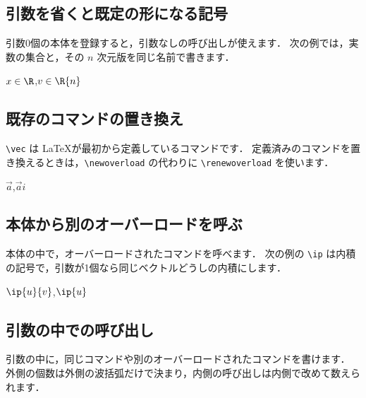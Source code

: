 \documentclass[lualatex,ja = standard,a4paper,11pt]{bxjsarticle}
\begin{document}
\subsection{引数を省くと既定の形になる記号}

引数0個の本体を登録すると，引数なしの呼び出しが使えます．
次の例では，実数の集合と，その $n$ 次元版を同じ名前で書きます．

\begin{example}
\newoverload{\R}

$x \in \R$,\quad $v \in \R{n}$
\end{example}

\subsection{既存のコマンドの置き換え}

\verb|\vec| は \LaTeX が最初から定義しているコマンドです．
定義済みのコマンドを置き換えるときは，\verb|\newoverload| の代わりに \verb|\renewoverload| を使います．

\begin{example}
\renewoverload{\vec}

$\vec{a}$,\quad $\vec{a}{i}$
\end{example}

\subsection{本体から別のオーバーロードを呼ぶ}

本体の中で，オーバーロードされたコマンドを呼べます．
次の例の \verb|\ip| は内積の記号で，引数が1個なら同じベクトルどうしの内積にします．

\begin{example}
\newoverload{\ip}

$\ip{u}{v}$,\quad $\ip{u}$
\end{example}

\subsection{引数の中での呼び出し}

引数の中に，同じコマンドや別のオーバーロードされたコマンドを書けます．
外側の個数は外側の波括弧だけで決まり，内側の呼び出しは内側で改めて数えられます．
\end{document}
